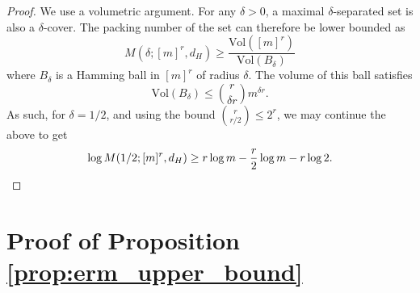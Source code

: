 \documentclass[11pt]{article}
\begin{document}
\begin{proof}
    We use a volumetric argument.
    For any $\delta > 0$, a maximal $\delta$-separated set is also a $\delta$-cover.
    The packing number \citep{wainwright2019high} of the set can therefore be lower bounded as
    \begin{equation}
        M(\delta;[m]^r,d_H) \geq \frac{\text{Vol}([m]^r)}{\text{Vol}(B_\delta)}
    \end{equation}
    where $B_\delta$ is a Hamming ball in $[m]^r$ of radius $\delta$.
    The volume of this ball satisfies
    \begin{equation}
        \text{Vol}(B_\delta) \leq \binom{r}{\delta r} m^{\delta r}.
    \end{equation}
    As such, for $\delta = 1/2$, and using the bound $\binom{r}{r/2} \leq 2^r$, we may continue the above to get
    \begin{equation}
        \begin{split}
            \log M(1/2;[m]^r,d_H) \geq r\log m - \frac{r}{2}\log m - r \log 2. \qedhere
        \end{split}
    \end{equation}
\end{proof}


\section{Proof of Proposition \ref{prop:erm_upper_bound}}
\label{sec:erm_proofs}
\end{document}
